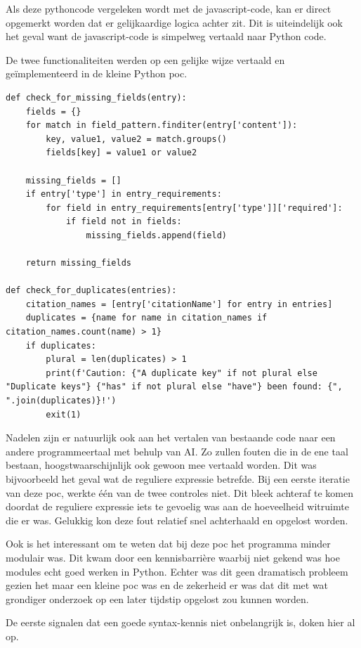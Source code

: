 Als deze pythoncode vergeleken wordt met de javascript-code, kan er direct opgemerkt worden dat er gelijkaardige logica achter zit. Dit is uiteindelijk ook het geval want de javascript-code is simpelweg vertaald naar Python code.

De twee functionaliteiten werden op een gelijke wijze vertaald en geïmplementeerd in de kleine Python poc.

\begin{verbatim}
def check_for_missing_fields(entry):
    fields = {}
    for match in field_pattern.finditer(entry['content']):
        key, value1, value2 = match.groups()
        fields[key] = value1 or value2

    missing_fields = []
    if entry['type'] in entry_requirements:
        for field in entry_requirements[entry['type']]['required']:
            if field not in fields:
                missing_fields.append(field)

    return missing_fields

def check_for_duplicates(entries):
    citation_names = [entry['citationName'] for entry in entries]
    duplicates = {name for name in citation_names if citation_names.count(name) > 1}
    if duplicates:
        plural = len(duplicates) > 1
        print(f'Caution: {"A duplicate key" if not plural else "Duplicate keys"} {"has" if not plural else "have"} been found: {", ".join(duplicates)}!')
        exit(1)
\end{verbatim}

Nadelen zijn er natuurlijk ook aan het vertalen van bestaande code naar een andere programmeertaal met behulp van AI. Zo zullen fouten die in de ene taal bestaan, hoogstwaarschijnlijk ook gewoon mee vertaald worden. Dit was bijvoorbeeld het geval wat de reguliere expressie betrefde. Bij een eerste iteratie van deze poc, werkte één van de twee controles niet. Dit bleek achteraf te komen doordat de reguliere expressie iets te gevoelig was aan de hoeveelheid witruimte die er was. Gelukkig kon deze fout relatief snel achterhaald en opgelost worden.

Ook is het interessant om te weten dat bij deze poc het programma minder modulair was. Dit kwam door een kennisbarrière waarbij niet gekend was hoe modules echt goed werken in Python. Echter was dit geen dramatisch probleem gezien het maar een kleine poc was en de zekerheid er was dat dit met wat grondiger onderzoek op een later tijdstip opgelost zou kunnen worden.

De eerste signalen dat een goede syntax-kennis niet onbelangrijk is, doken hier al op.

